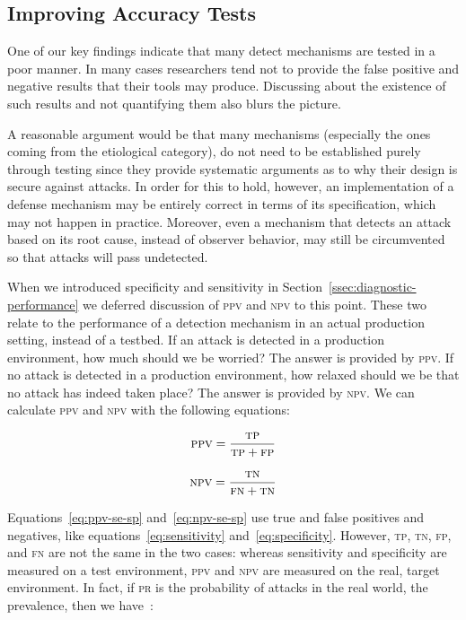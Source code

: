 \documentclass[conference]{IEEEtran}
\begin{document}
\subsection{Improving Accuracy Tests}

One of our key findings indicate that many detect mechanisms are
tested in a poor manner. In many cases researchers tend not to provide
the false positive and negative results that their tools may produce.
Discussing about the existence of such results and not quantifying
them also blurs the picture.

A reasonable argument would be that many mechanisms (especially the
ones coming from the etiological category), do not need to be
established purely through testing since they provide systematic
arguments as to why their design is secure against attacks. In order
for this to hold, however, an implementation of a defense mechanism
may be entirely correct in terms of its specification, which may not
happen in practice. Moreover, even a mechanism that detects an attack
based on its root cause, instead of observer behavior, may still be
circumvented so that attacks will pass undetected.

When we introduced specificity and sensitivity in
Section~\ref{ssec:diagnostic-performance} we deferred discussion of
\textsc{ppv} and \textsc{npv} to this point. These two relate to the
performance of a detection mechanism in an actual production setting,
instead of a testbed. If an attack is detected in a production
environment, how much should we be worried? The answer is provided by
\textsc{ppv}. If no attack is detected in a production environment,
how relaxed should we be that no attack has indeed taken place? The
answer is provided by \textsc{npv}. We can calculate \textsc{ppv} and
\textsc{npv} with the following equations:

\begin{equation}
\textsc{ppv} = \frac{\textsc{tp}}{\textsc{tp} + \textsc{fp}}
\end{equation}

\begin{equation}
\textsc{npv} = \frac{\textsc{tn}}{\textsc{fn} + \textsc{tn}}
\end{equation}

\noindent
Equations~\ref{eq:ppv-se-sp} and~\ref{eq:npv-se-sp} use true and false
positives and negatives, like equations~\ref{eq:sensitivity}
and~\ref{eq:specificity}. However, \textsc{tp}, \textsc{tn},
\textsc{fp}, and \textsc{fn} are not the same in the two cases:
whereas sensitivity and specificity are measured on a test
environment, \textsc{ppv} and \textsc{npv} are measured on the real,
target environment. In fact, if \textsc{pr} is the probability of
attacks in the real world, the prevalence, then we
have~\cite{linn2004,altman1994}:
\end{document}
